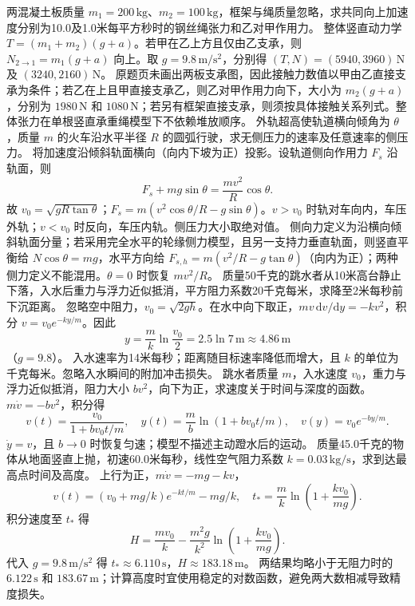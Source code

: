 \problemtext 两混凝土板质量 $m_1=200\,\mathrm{kg}$、$m_2=100\,\mathrm{kg}$，框架与绳质量忽略，求共同向上加速度分别为10.0及1.0米每平方秒时的钢丝绳张力和乙对甲作用力。
\workings 整体竖直动力学 $T=(m_1+m_2)(g+a)$。若甲在乙上方且仅由乙支承，则 $N_{2\to1}=m_1(g+a)$ 向上。取 $g=9.8\,\mathrm{m/s^2}$，分别得 $(T,N)=(5940,3960)\,\mathrm N$ 及 $(3240,2160)\,\mathrm N$。
\crosscheck 原题页未画出两板支承图，因此接触力数值以甲由乙直接支承为条件；若乙在上且甲直接支承乙，则乙对甲作用力向下，大小为 $m_2(g+a)$，分别为 $1980\,\mathrm N$ 和 $1080\,\mathrm N$；若另有框架直接支承，则须按具体接触关系列式。整体张力在单根竖直承重绳模型下不依赖堆放顺序。
\problemtext 外轨超高使轨道横向倾角为 $\theta$，质量 $m$ 的火车沿水平半径 $R$ 的圆弧行驶，求无侧压力的速率及任意速率的侧压力。
\workings 将加速度沿倾斜轨面横向（向内下坡为正）投影。设轨道侧向作用力 $F_s$ 沿轨面，则
\[
F_s+mg\sin\theta=\frac{mv^2}{R}\cos\theta.
\]
故 $v_0=\sqrt{gR\tan\theta}$；$F_s=m(v^2\cos\theta/R-g\sin\theta)$。$v>v_0$ 时轨对车向内，车压外轨；$v<v_0$ 时反向，车压内轨。侧压力大小取绝对值。
\crosscheck 侧向力定义为沿横向倾斜轨面分量；若采用完全水平的轮缘侧力模型，且另一支持力垂直轨面，则竖直平衡给 $N\cos\theta=mg$，水平方向给 $F_{s,h}=m(v^2/R-g\tan\theta)$（向内为正）；两种侧力定义不能混用。$\theta=0$ 时恢复 $mv^2/R$。
\problemtext 质量50千克的跳水者从10米高台静止下落，入水后重力与浮力近似抵消，平方阻力系数20千克每米，求降至2米每秒前下沉距离。
\workings 忽略空中阻力，$v_0=\sqrt{2gh}$。在水中向下取正，$mv\,\mathrm dv/\mathrm dy=-kv^2$，积分 $v=v_0e^{-ky/m}$。因此
\[
y=\frac{m}{k}\ln\frac{v_0}{2}
=2.5\ln7\,\mathrm m\approx4.86\,\mathrm m
\]
（$g=9.8$）。
\crosscheck 入水速率为14米每秒；距离随目标速率降低而增大，且 $k$ 的单位为千克每米。忽略入水瞬间的附加冲击损失。
\problemtext 跳水者质量 $m$，入水速度 $v_0$，重力与浮力近似抵消，阻力大小 $bv^2$，向下为正，求速度关于时间与深度的函数。
\workings $m\dot v=-bv^2$，积分得
\[
v(t)=\frac{v_0}{1+bv_0t/m},\quad
y(t)=\frac mb\ln(1+bv_0t/m),\quad
v(y)=v_0e^{-by/m}.
\]
\crosscheck $\dot y=v$，且 $b\to0$ 时恢复匀速；模型不描述主动蹬水后的运动。
\problemtext 质量45.0千克的物体从地面竖直上抛，初速60.0米每秒，线性空气阻力系数 $k=0.03\,\mathrm{kg/s}$，求到达最高点时间及高度。
\workings 上行为正，$m\dot v=-mg-kv$，
\[
v(t)=(v_0+mg/k)e^{-kt/m}-mg/k,\quad
t_*=\frac mk\ln\left(1+\frac{kv_0}{mg}\right).
\]
积分速度至 $t_*$ 得
\[
H=\frac{mv_0}{k}-\frac{m^2g}{k^2}\ln\left(1+\frac{kv_0}{mg}\right).
\]
代入 $g=9.8\,\mathrm{m/s^2}$ 得 $t_*\approx6.110\,\mathrm s$，$H\approx183.18\,\mathrm m$。
\crosscheck 两结果均略小于无阻力时的 $6.122\,\mathrm s$ 和 $183.67\,\mathrm m$；计算高度时宜使用稳定的对数函数，避免两大数相减导致精度损失。
